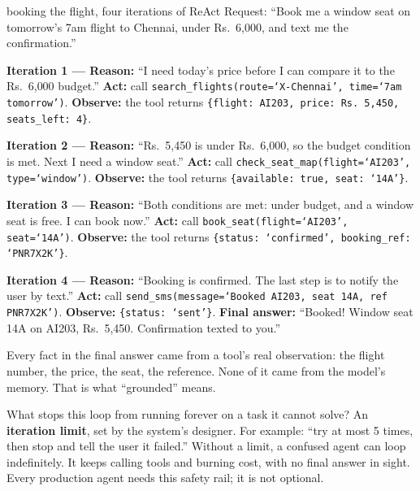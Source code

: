 \documentclass[a4paper,11pt]{article}
\newcommand{\vocab}[1]{\textbf{#1}}
\begin{document}
\begin{worked}{booking the flight, four iterations of ReAct}
Request: ``Book me a window seat on tomorrow's 7am flight to Chennai, under
Rs.~6{,}000, and text me the confirmation.''
\begin{steps}
  \item \textbf{Iteration 1 --- Reason:} ``I need today's price before I can
    compare it to the Rs.~6{,}000 budget.'' \textbf{Act:} call
    \texttt{search\_flights(route=`X-Chennai', time=`7am tomorrow')}.
    \textbf{Observe:} the tool returns \texttt{\{flight: AI203, price:
    Rs.~5{,}450, seats\_left: 4\}}.
  \item \textbf{Iteration 2 --- Reason:} ``Rs.~5{,}450 is under Rs.~6{,}000, so the
    budget condition is met. Next I need a window seat.''
    \textbf{Act:} call \texttt{check\_seat\_map(flight=`AI203',
    type=`window')}. \textbf{Observe:} the tool returns \texttt{\{available:
    true, seat: `14A'\}}.
  \item \textbf{Iteration 3 --- Reason:} ``Both conditions are met: under
    budget, and a window seat is free. I can book now.'' \textbf{Act:}
    call \texttt{book\_seat(flight=`AI203', seat=`14A')}. \textbf{Observe:}
    the tool returns \texttt{\{status: `confirmed', booking\_ref:
    `PNR7X2K'\}}.
  \item \textbf{Iteration 4 --- Reason:} ``Booking is confirmed. The last
    step is to notify the user by text.'' \textbf{Act:} call
    \texttt{send\_sms(message=`Booked AI203, seat 14A, ref PNR7X2K')}.
    \textbf{Observe:} \texttt{\{status: `sent'\}}. \textbf{Final answer:}
    ``Booked! Window seat 14A on AI203, Rs.~5{,}450. Confirmation texted to
    you.''
\end{steps}
Every fact in the final answer came from a tool's real observation: the
flight number, the price, the seat, the reference. None of it came from the
model's memory. That is what ``grounded'' means.
\end{worked}

\begin{watchout}
What stops this loop from running forever on a task it cannot solve? An
\vocab{iteration limit}, set by the system's designer. For example: ``try at
most 5 times, then stop and tell the user it failed.'' Without a limit, a
confused agent can loop indefinitely. It keeps calling tools and burning
cost, with no final answer in sight. Every production agent needs this
safety rail; it is not optional.
\end{watchout}
\end{document}
